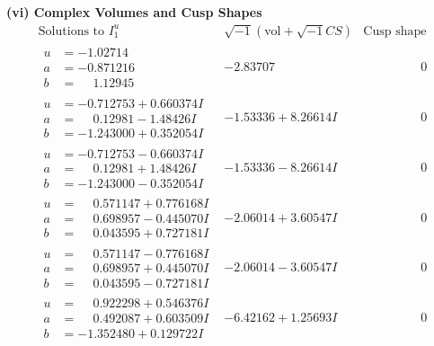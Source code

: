 \documentclass[1p]{elsarticle_modified}
\theoremstyle{definition}
\newcommand{\I}{\sqrt{-1}}
\begin{document}
\newpage\flushleft \textbf{(vi) Complex Volumes and Cusp Shapes}
$$\begin{array}{c|c|c}  
\text{Solutions to }I^u_{1}& \I (\text{vol} + \sqrt{-1}CS) & \text{Cusp shape}\\
 \hline 
\begin{aligned}
u &= -1.02714\phantom{ +0.000000I} \\
a &= -0.871216\phantom{ +0.000000I} \\
b &= \phantom{-}1.12945\phantom{ +0.000000I}\end{aligned}
 & -2.83707\phantom{ +0.000000I} & \phantom{-0.000000 } 0 \\ \hline\begin{aligned}
u &= -0.712753 + 0.660374 I \\
a &= \phantom{-}0.12981 - 1.48426 I \\
b &= -1.243000 + 0.352054 I\end{aligned}
 & -1.53336 + 8.26614 I & \phantom{-0.000000 } 0 \\ \hline\begin{aligned}
u &= -0.712753 - 0.660374 I \\
a &= \phantom{-}0.12981 + 1.48426 I \\
b &= -1.243000 - 0.352054 I\end{aligned}
 & -1.53336 - 8.26614 I & \phantom{-0.000000 } 0 \\ \hline\begin{aligned}
u &= \phantom{-}0.571147 + 0.776168 I \\
a &= \phantom{-}0.698957 - 0.445070 I \\
b &= \phantom{-}0.043595 + 0.727181 I\end{aligned}
 & -2.06014 + 3.60547 I & \phantom{-0.000000 } 0 \\ \hline\begin{aligned}
u &= \phantom{-}0.571147 - 0.776168 I \\
a &= \phantom{-}0.698957 + 0.445070 I \\
b &= \phantom{-}0.043595 - 0.727181 I\end{aligned}
 & -2.06014 - 3.60547 I & \phantom{-0.000000 } 0 \\ \hline\begin{aligned}
u &= \phantom{-}0.922298 + 0.546376 I \\
a &= \phantom{-}0.492087 + 0.603509 I \\
b &= -1.352480 + 0.129722 I\end{aligned}
 & -6.42162 + 1.25693 I & \phantom{-0.000000 } 0 \\ \hline\begin{aligned}

\end{aligned}
\end{array}$$
\end{document}

